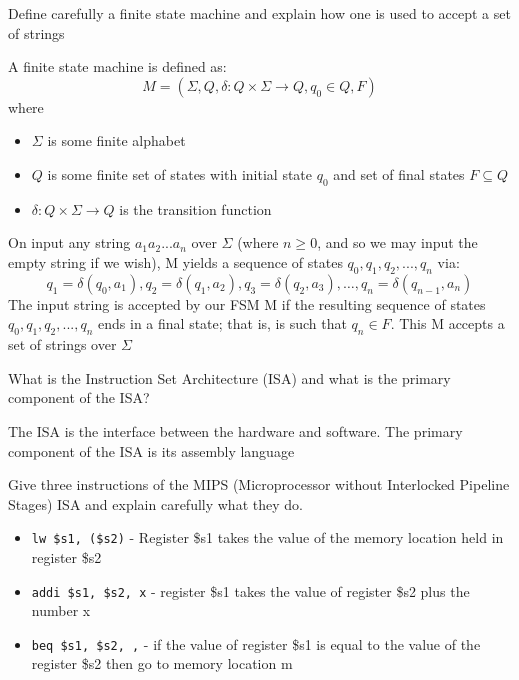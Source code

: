 \documentclass[addpoints]{exam}
\begin{document}
\begin{questions}
\question[8]Define carefully a finite state machine and explain how one is used to accept a set of strings
\begin{solution}[2in]
	A finite state machine is defined as:
	\[
	M=\left(\Sigma, Q, \delta : Q \times \Sigma \rightarrow Q, q_{0} \in Q, F\right)
	\]
	where
	\begin{itemize}
		\item $\Sigma$ is some finite alphabet
		\item $Q$ is some finite set of states with initial state $q_0$ and set of final states $F\subseteq Q$
		\item $\delta: Q\times \Sigma \rightarrow Q$ is the transition function
	\end{itemize}
	On input any string $a_1a_2...a_n$ over $\Sigma$ (where $n \geq 0$, and so we may input the empty string if we wish), M yields a sequence of states $q_0,q_1,q_2,...,q_n$ via:
	\[
	q_{1}=\delta\left(q_{0}, a_{1}\right), q_{2}=\delta\left(q_{1}, a_{2}\right), q_{3}=\delta\left(q_{2}, a_{3}\right), \ldots, q_{n}=\delta\left(q_{n-1}, a_{n}\right)
	\]
	The input string is accepted by our FSM M if the resulting sequence of states $q_0,q_1,q_2,...,q_n$ ends in a final state; that is, is such that $q_n\in F$. This M accepts a set of strings over $\Sigma$
\end{solution}

\question[3]What is the Instruction Set Architecture (ISA) and what is the primary component of the ISA?
\begin{solution}[2in]
	The ISA is the interface between the hardware and software. The primary component of the ISA is its assembly language
\end{solution}

\question[6]Give three instructions of the MIPS (Microprocessor without Interlocked Pipeline Stages) ISA and explain carefully what they do.
\begin{solution}[2in]
	\begin{itemize}
		\item \texttt{lw \$s1, (\$s2)} - Register \$s1 takes the value of the memory location held in register \$s2
		\item \texttt{addi \$s1, \$s2, x} - register \$s1 takes the value of register \$s2 plus the number x
		\item \texttt{beq \$s1, \$s2, ,} - if the value of register \$s1 is equal to the value of the register \$s2 then go to memory location m
	\end{itemize}
\end{solution}


\end{questions}
\end{document}
